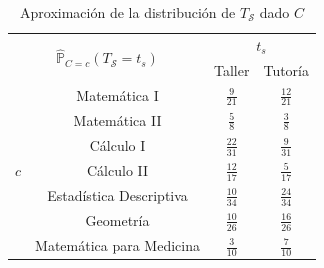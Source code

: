 \documentclass[11pt,a4paper]{book}
\theoremstyle{definition}%
\newcommand{\Probsymb}{\mathds{P}}
\begin{document}
                \begin{table}[H]
                    \centering
                    \begin{tabular}{|c|c|c|c|}
                        \hline
                        \multicolumn{2}{|c|}{\multirow{2}{*}{$\hat{\Probsymb}_{C=c}(T_\mathcal{S}=t_s)$}} & \multicolumn{2}{c|}{$t_s$} \\ \cline{3-4}
                        \multicolumn{2}{|c|}{} & Taller & Tutoría \\ \hline
                        \multirow{7}{*}{$c$} & Matemática I & $\frac{9}{21}$ & $\frac{12}{21}$ \\ \cline{2-4}
                        & Matemática II & $\frac{5}{8}$ & $\frac{3}{8}$  \\ \cline{2-4}
                        & Cálculo I & $\frac{22}{31}$ & $\frac{9}{31}$  \\ \cline{2-4}
                        & Cálculo II & $\frac{12}{17}$ & $\frac{5}{17}$  \\ \cline{2-4}
                        & Estadística Descriptiva & $\frac{10}{34}$ & $\frac{24}{34}$  \\ \cline{2-4}
                        & Geometría & $\frac{10}{26}$ & $\frac{16}{26}$  \\ \cline{2-4}
                        & Matemática para Medicina & $\frac{3}{10}$ & $\frac{7}{10}$   \\ \hline
                    \end{tabular}
                    \caption{Aproximación de la distribución de $T_\mathcal{S}$ dado $C$}
                    \label{tab:distribucion_Ts_C}
                \end{table}
\end{document}
